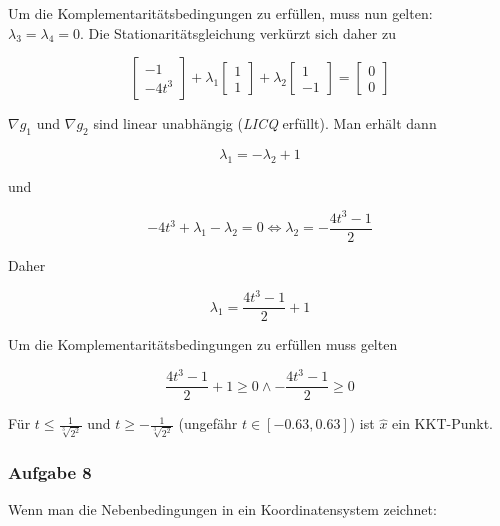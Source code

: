 \documentclass[a4paper, 12pt]{report}
\begin{document}
Um die Komplementaritätsbedingungen zu erfüllen, muss nun gelten:\\
$\lambda_3 = \lambda_4 = 0$. Die Stationaritätsgleichung verkürzt sich daher zu

$$\begin{bmatrix}-1\\-4t^3\end{bmatrix} + \lambda_1 \begin{bmatrix}1\\1\end{bmatrix} + \lambda_2\begin{bmatrix}1\\-1\end{bmatrix} = \begin{bmatrix}0\\0\end{bmatrix}$$

$\nabla g_1$ und $\nabla g_2$ sind linear unabhängig (\textit{LICQ} erfüllt). Man erhält dann

$$\lambda_1 = -\lambda_2 + 1$$

und

$$-4t^3 + \lambda_1 - \lambda_2 = 0 \Leftrightarrow \lambda_2 = - \frac{4t^3 - 1}{2}$$

Daher

$$\lambda_1 = \frac{4t^3 - 1}{2} + 1$$

Um die Komplementaritätsbedingungen zu erfüllen muss gelten

$$\frac{4t^3 - 1}{2} + 1 \geq 0 \land - \frac{4t^3 - 1}{2} \geq 0$$

Für $t \leq \frac{1}{\sqrt[3]{2^2}}$ und $t \geq -\frac{1}{\sqrt[3]{2^2}}$ (ungefähr $t \in [-0.63, 0.63]$) ist $\hat{x}$ ein KKT-Punkt.

\subsubsection{Aufgabe 8}

Wenn man die Nebenbedingungen in ein Koordinatensystem zeichnet:
\end{document}
